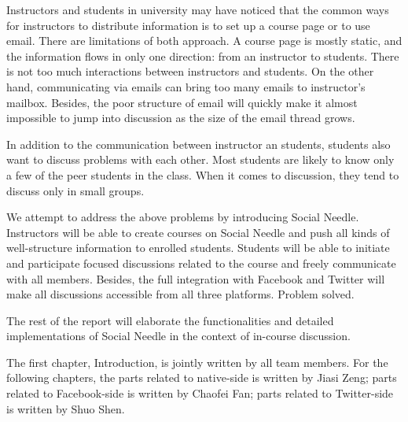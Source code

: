 Instructors and students in university may have noticed that the common ways for instructors to distribute information is to set up a course page or to use email. There are limitations of both approach. A course page is mostly static, and the information flows in only one direction: from an instructor to students. There is not too much interactions between instructors and students. On the other hand, communicating via emails can bring too many emails to instructor’s mailbox. Besides, the poor structure of email will quickly make it almost impossible to jump into discussion as the size of the email thread grows.

In addition to the communication between instructor an students, students also want to discuss problems with each other. Most students are likely to know only a few of the peer students in the class. When it comes to discussion, they tend to discuss only in small groups.

We attempt to address the above problems by introducing Social Needle. Instructors will be able to create courses on Social Needle and push all kinds of well-structure information to enrolled students. Students will be able to initiate and participate focused discussions related to the course and freely communicate with all members. Besides, the full integration with Facebook and Twitter will make all discussions accessible from all three platforms. Problem solved.   

The rest of the report will elaborate the functionalities and detailed implementations of Social Needle in the context of in-course discussion. 

The first chapter, Introduction, is jointly written by all team members. For the following chapters, the parts related to native-side is written by Jiasi Zeng; parts related to Facebook-side is written by Chaofei Fan; parts related to Twitter-side is written by Shuo Shen. 
